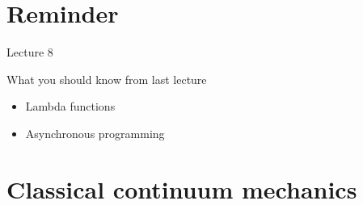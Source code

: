 \documentclass[12pt,t]{beamer}
\title{\coursename}
\subtitle{Lecture 8: Introduction to bond-based peridynamics}
\date {
 \tiny \url{\courseurl}
\vspace{2cm}
\doclicenseThis  
  
}
\begin{document}
 {
    \frame {
        \titlepage
    }
}

\frame{

\tableofcontents

}


\section{Reminder}
\begin{frame}{Lecture 8}
\begin{block}{What you should know from last lecture}
\begin{itemize}
\item Lambda functions
\item Asynchronous programming
\end{itemize}
\end{block}
\end{frame}


\section{Classical continuum mechanics}
\end{document}
